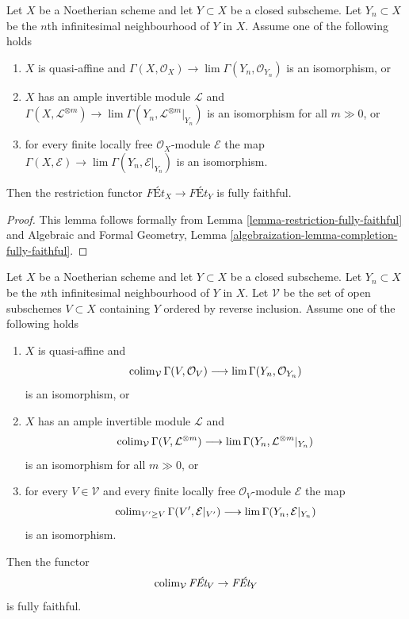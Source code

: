 \begin{lemma}
\label{lemma-restriction-fully-faithful-special}
Let $X$ be a Noetherian scheme and let $Y \subset X$ be a closed subscheme.
Let $Y_n \subset X$ be the $n$th infinitesimal neighbourhood of $Y$ in $X$.
Assume one of the following holds
\begin{enumerate}
\item $X$ is quasi-affine and
$\Gamma(X, \mathcal{O}_X) \to \lim \Gamma(Y_n, \mathcal{O}_{Y_n})$
is an isomorphism, or
\item $X$ has an ample invertible module $\mathcal{L}$ and
$\Gamma(X, \mathcal{L}^{\otimes m}) \to
\lim \Gamma(Y_n, \mathcal{L}^{\otimes m}|_{Y_n})$
is an isomorphism for all $m \gg 0$, or
\item for every finite locally free $\mathcal{O}_X$-module
$\mathcal{E}$ the map
$\Gamma(X, \mathcal{E}) \to \lim \Gamma(Y_n, \mathcal{E}|_{Y_n})$
is an isomorphism.
\end{enumerate}
Then the restriction functor $\textit{F\'Et}_X \to \textit{F\'Et}_Y$
is fully faithful.
\end{lemma}

\begin{proof}
This lemma follows formally from
Lemma \ref{lemma-restriction-fully-faithful} and
Algebraic and Formal Geometry, Lemma
\ref{algebraization-lemma-completion-fully-faithful}.
\end{proof}

\begin{lemma}
\label{lemma-restriction-fully-faithful-general-special}
Let $X$ be a Noetherian scheme and let $Y \subset X$ be a closed subscheme.
Let $Y_n \subset X$ be the $n$th infinitesimal neighbourhood of $Y$ in $X$.
Let $\mathcal{V}$ be the set of open subschemes $V \subset X$ containing $Y$
ordered by reverse inclusion. Assume one of the following holds
\begin{enumerate}
\item $X$ is quasi-affine and
$$
\mathop{\mathrm{colim}}\nolimits_\mathcal{V} \Gamma(V, \mathcal{O}_V)
\longrightarrow
\mathop{\mathrm{lim}}\nolimits \Gamma(Y_n, \mathcal{O}_{Y_n})
$$
is an isomorphism, or
\item $X$ has an ample invertible module $\mathcal{L}$ and
$$
\mathop{\mathrm{colim}}\nolimits_\mathcal{V} \Gamma(V, \mathcal{L}^{\otimes m})
\longrightarrow
\mathop{\mathrm{lim}}\nolimits \Gamma(Y_n, \mathcal{L}^{\otimes m}|_{Y_n})
$$
is an isomorphism for all $m \gg 0$, or
\item for every $V \in \mathcal{V}$ and every finite locally free
$\mathcal{O}_V$-module $\mathcal{E}$ the map
$$
\mathop{\mathrm{colim}}\nolimits_{V' \geq V} \Gamma(V', \mathcal{E}|_{V'})
\longrightarrow
\mathop{\mathrm{lim}}\nolimits \Gamma(Y_n, \mathcal{E}|_{Y_n})
$$
is an isomorphism.
\end{enumerate}
Then the functor
$$
\mathop{\mathrm{colim}}\nolimits_\mathcal{V} \textit{F\'Et}_V \to \textit{F\'Et}_Y
$$
is fully faithful.
\end{lemma}

